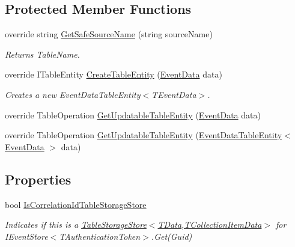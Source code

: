 \subsection*{Protected Member Functions}
\begin{DoxyCompactItemize}
\item 
override string \hyperlink{classCqrs_1_1Azure_1_1BlobStorage_1_1Events_1_1TableStorageEventStore_1_1RawTableStorageEventStore_ab02dd26098d25c2663abdf3da9f57f0f_ab02dd26098d25c2663abdf3da9f57f0f}{Get\+Safe\+Source\+Name} (string source\+Name)
\begin{DoxyCompactList}\small\item\em Returns Table\+Name. \end{DoxyCompactList}\item 
override I\+Table\+Entity \hyperlink{classCqrs_1_1Azure_1_1BlobStorage_1_1Events_1_1TableStorageEventStore_1_1RawTableStorageEventStore_a916cc6bc33379535690aa0c2e7e90554_a916cc6bc33379535690aa0c2e7e90554}{Create\+Table\+Entity} (\hyperlink{classCqrs_1_1Events_1_1EventData}{Event\+Data} data)
\begin{DoxyCompactList}\small\item\em Creates a new Event\+Data\+Table\+Entity$<$\+T\+Event\+Data$>$. \end{DoxyCompactList}\item 
override Table\+Operation \hyperlink{classCqrs_1_1Azure_1_1BlobStorage_1_1Events_1_1TableStorageEventStore_1_1RawTableStorageEventStore_afa1fdd2a115ebf6e12411f8a9e7029a9_afa1fdd2a115ebf6e12411f8a9e7029a9}{Get\+Updatable\+Table\+Entity} (\hyperlink{classCqrs_1_1Events_1_1EventData}{Event\+Data} data)
\item 
override Table\+Operation \hyperlink{classCqrs_1_1Azure_1_1BlobStorage_1_1Events_1_1TableStorageEventStore_1_1RawTableStorageEventStore_a36cc2b354b0e2dc33a032473e459c8ec_a36cc2b354b0e2dc33a032473e459c8ec}{Get\+Updatable\+Table\+Entity} (\hyperlink{classCqrs_1_1Azure_1_1BlobStorage_1_1EventDataTableEntity}{Event\+Data\+Table\+Entity}$<$ \hyperlink{classCqrs_1_1Events_1_1EventData}{Event\+Data} $>$ data)
\end{DoxyCompactItemize}
\subsection*{Properties}
\begin{DoxyCompactItemize}
\item 
bool \hyperlink{classCqrs_1_1Azure_1_1BlobStorage_1_1Events_1_1TableStorageEventStore_1_1RawTableStorageEventStore_a566f4821980b2ca77f12f88d010beff2_a566f4821980b2ca77f12f88d010beff2}{Is\+Correlation\+Id\+Table\+Storage\+Store}
\begin{DoxyCompactList}\small\item\em Indicates if this is a \hyperlink{classCqrs_1_1Azure_1_1BlobStorage_1_1TableStorageStore_aabc36bc46ffb22b716cc7769a641cfab_aabc36bc46ffb22b716cc7769a641cfab}{Table\+Storage\+Store$<$\+T\+Data,\+T\+Collection\+Item\+Data$>$} for I\+Event\+Store$<$\+T\+Authentication\+Token$>$.\+Get(\+Guid) \end{DoxyCompactList}\end{DoxyCompactItemize}


